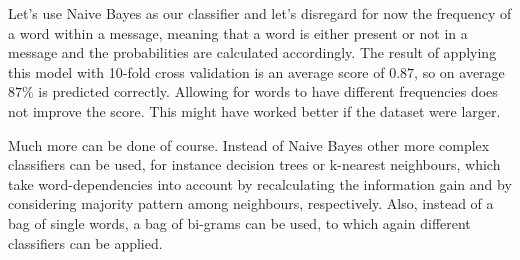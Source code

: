 \documentclass{llncs}
\begin{document}
Let's use Naive Bayes as our classifier and let's disregard for now the frequency of a word within a message, meaning that a word is either present or not in a message and the probabilities are calculated accordingly. The result of applying this model with 10-fold cross validation is an average score of $0.87$, so on average $87\%$ is predicted correctly. Allowing for words to have different frequencies does not improve the score. This might have worked better if the dataset were larger.

Much more can be done of course. Instead of Naive Bayes other more complex classifiers can be used, for instance decision trees or k-nearest neighbours, which take word-dependencies into account by recalculating the information gain and by considering majority pattern among neighbours, respectively. Also, instead of a bag of single words, a bag of bi-grams can be used, to which again different classifiers can be applied.    

                        


\end{document}
